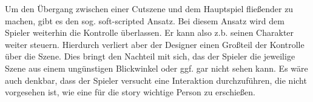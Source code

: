 Um den Übergang zwischen einer Cutszene und dem Hauptspiel fließender zu machen, gibt es den sog. soft-scripted Ansatz. Bei diesem Ansatz wird dem Spieler weiterhin die Kontrolle überlassen. Er kann also z.b. seinen Charakter weiter steuern. Hierdurch verliert aber der Designer einen Großteil der Kontrolle über die Szene. Dies bringt den Nachteil mit sich, das der Spieler die jeweilige Szene aus einem ungünstigen Blickwinkel oder ggf. gar nicht sehen kann. Es wäre auch denkbar, dass der Spieler versucht eine Interaktion durchzuführen, die nicht vorgesehen ist, wie eine für die story wichtige Person zu erschießen. 

%
%
%
%
